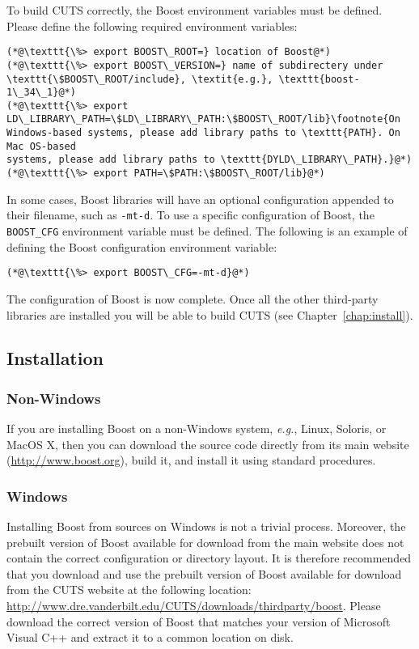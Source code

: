 To build CUTS correctly, the Boost environment variables must be defined. Please 
define the following required environment variables:
\begin{lstlisting}
(*@\texttt{\%> export BOOST\_ROOT=} location of Boost@*)
(*@\texttt{\%> export BOOST\_VERSION=} name of subdirectery under \texttt{\$BOOST\_ROOT/include}, \textit{e.g.}, \texttt{boost-1\_34\_1}@*)
(*@\texttt{\%> export LD\_LIBRARY\_PATH=\$LD\_LIBRARY\_PATH:\$BOOST\_ROOT/lib}\footnote{On
Windows-based systems, please add library paths to \texttt{PATH}. On Mac OS-based
systems, please add library paths to \texttt{DYLD\_LIBRARY\_PATH}.}@*)
(*@\texttt{\%> export PATH=\$PATH:\$BOOST\_ROOT/lib}@*)
\end{lstlisting}
In some cases, Boost libraries will have an optional configuration appended to 
their filename, such as \texttt{-mt-d}. To use a specific configuration of 
Boost, the \texttt{BOOST\_CFG} environment variable must be defined. The 
following is an example of defining the Boost configuration environment 
variable:
\begin{lstlisting}
(*@\texttt{\%> export BOOST\_CFG=-mt-d}@*)
\end{lstlisting}
The configuration of Boost is now complete. Once all the other
third-party libraries are installed you will be able to build CUTS
(see Chapter~\ref{chap:install}).

\subsection{Installation}

\subsubsection{Non-Windows}
 
If you are installing Boost on a non-Windows system, \textit{e.g.}, Linux, 
Soloris, or MacOS X, then you can download the source code directly from its
main website (\url{http://www.boost.org}), build it, and install it using
standard procedures.

\subsubsection{Windows}

Installing Boost from sources on Windows is not a trivial process. 
Moreover, the prebuilt version of Boost available for download from 
the main website does not contain the correct configuration or directory
layout. It is therefore recommended that you download and use the prebuilt 
version of Boost available for download from the CUTS website at the 
following location:
\url{http://www.dre.vanderbilt.edu/CUTS/downloads/thirdparty/boost}. Please download
the correct version of Boost that matches your version of Microsoft Visual
C++ and extract it to a common location on disk.

